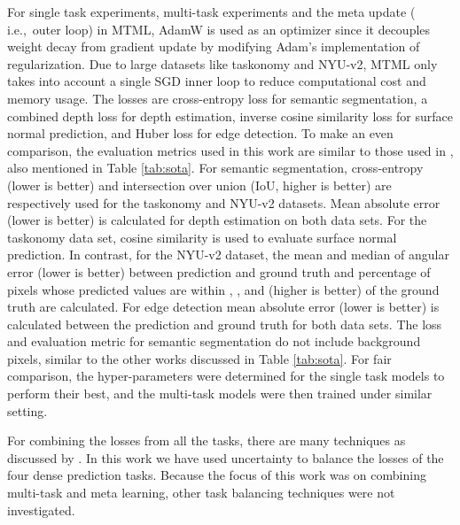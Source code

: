 \documentclass[conference]{IEEEtran}
\newcommand*{\ie}		{i.e.,\ }
\begin{document}
For single task experiments, multi-task experiments and the meta update ( \ie outer loop) in \ac{MTML}, AdamW \cite{adamw} is used as an optimizer since it decouples weight decay from gradient update by modifying Adam's \cite{adam} implementation of  regularization. 
Due to large datasets like taskonomy and NYU-v2, \ac{MTML} only takes into account a single SGD \cite{sutskever2013importance} inner loop to reduce computational cost and memory usage.
The losses are cross-entropy loss for semantic segmentation, a combined depth loss \cite{hu2019revisiting} for depth estimation,  inverse cosine similarity loss for surface normal prediction, and Huber loss \cite{PAUL2022100218} for edge detection. 
To make an even comparison, the evaluation metrics used in this work are similar to those used in \cite{sun2020adashare, misra2016cross, liu2019end, gao2019nddr, ruder2019latent}, also mentioned in Table \ref{tab:sota}.
For semantic segmentation, cross-entropy (lower is better) and intersection over union (IoU, higher is better) are respectively used for the taskonomy and NYU-v2 datasets.
Mean absolute error (lower is better) is calculated for depth estimation on both data sets.
For the taskonomy data set, cosine similarity is used to evaluate surface normal prediction.
In contrast, for the NYU-v2 dataset, the mean and median of angular error (lower is better) between prediction and ground truth and percentage of pixels whose predicted values are within , , and  \cite{sun2020adashare} (higher is better) of the ground truth are calculated. 
For edge detection mean absolute error (lower is better) is calculated between the prediction and ground truth for both data sets.
The loss and evaluation metric for semantic segmentation do not include background pixels, similar to the other works discussed in Table \ref{tab:sota}.
For fair comparison, the hyper-parameters were determined for the single task models to perform their best, and the multi-task models were then trained under similar setting. 

For combining the losses from all the tasks, there are many techniques as discussed by \cite{vandenhende2021multi}. In this work we have used uncertainty \cite{kendall2018multi} to balance the losses of the four dense prediction tasks. 
Because the focus of this work was on combining multi-task and meta learning, other task balancing techniques were not investigated.
\end{document}
